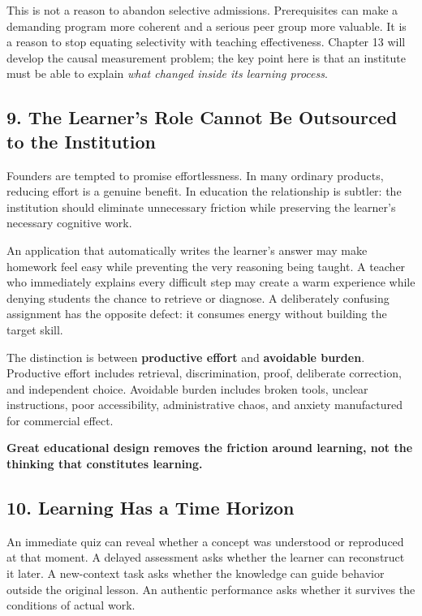 This is not a reason to abandon selective admissions. Prerequisites can make a demanding program more coherent and a serious peer group more valuable. It is a reason to stop equating selectivity with teaching effectiveness. Chapter 13 will develop the causal measurement problem; the key point here is that an institute must be able to explain \emph{what changed inside its learning process}.

\subsection*{9. The Learner's Role Cannot Be Outsourced to the Institution}

Founders are tempted to promise effortlessness. In many ordinary products, reducing effort is a genuine benefit. In education the relationship is subtler: the institution should eliminate unnecessary friction while preserving the learner's necessary cognitive work.

An application that automatically writes the learner's answer may make homework feel easy while preventing the very reasoning being taught. A teacher who immediately explains every difficult step may create a warm experience while denying students the chance to retrieve or diagnose. A deliberately confusing assignment has the opposite defect: it consumes energy without building the target skill.

The distinction is between \textbf{productive effort} and \textbf{avoidable burden}. Productive effort includes retrieval, discrimination, proof, deliberate correction, and independent choice. Avoidable burden includes broken tools, unclear instructions, poor accessibility, administrative chaos, and anxiety manufactured for commercial effect.

\textbf{Great educational design removes the friction around learning, not the thinking that constitutes learning.}

\subsection*{10. Learning Has a Time Horizon}

An immediate quiz can reveal whether a concept was understood or reproduced at that moment. A delayed assessment asks whether the learner can reconstruct it later. A new-context task asks whether the knowledge can guide behavior outside the original lesson. An authentic performance asks whether it survives the conditions of actual work.

